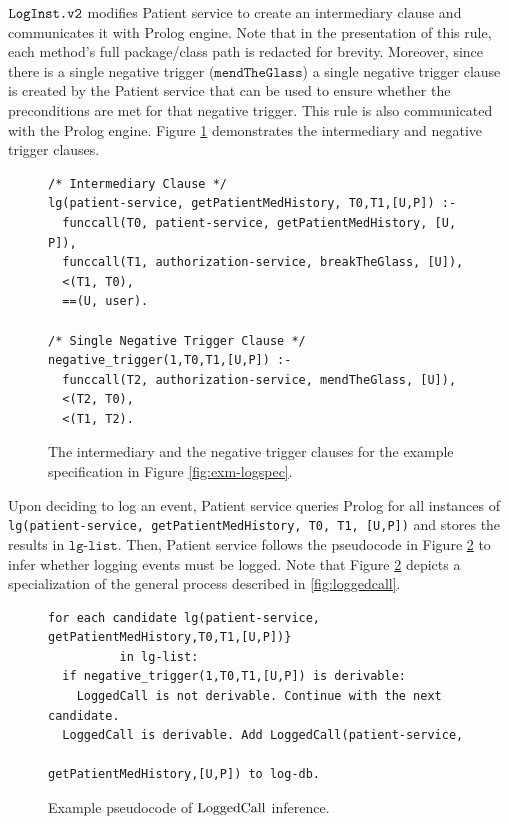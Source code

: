$\texttt{LogInst.v2}$ modifies Patient service to create an intermediary clause and communicates it with Prolog engine. Note that in the presentation of this rule, each method's full package/class path is redacted for brevity. Moreover, since there is a single negative trigger ($\texttt{mendTheGlass}$) a single negative trigger clause is created by the Patient service that can be used to ensure whether the preconditions are met for that negative trigger. This rule is also communicated with the Prolog engine.  Figure \ref{fig:exm-intermediary} demonstrates the intermediary and negative trigger clauses.

\begin{figure}
\begin{tiny}
\begin{Verbatim}[frame=single]
/* Intermediary Clause */
lg(patient-service, getPatientMedHistory, T0,T1,[U,P]) :- 
  funccall(T0, patient-service, getPatientMedHistory, [U, P]),
  funccall(T1, authorization-service, breakTheGlass, [U]),
  <(T1, T0),
  ==(U, user).

/* Single Negative Trigger Clause */ 
negative_trigger(1,T0,T1,[U,P]) :-
  funccall(T2, authorization-service, mendTheGlass, [U]),
  <(T2, T0),
  <(T1, T2).
\end{Verbatim}
\end{tiny}
\caption{The intermediary and the negative trigger clauses for the example specification in Figure \ref{fig:exm-logspec}.}
\label{fig:exm-intermediary}
\end{figure}

Upon deciding to log an event, Patient service queries Prolog for all instances of \texttt{lg(patient-service, getPatientMedHistory, T0, T1, [U,P])} and stores the results in $\texttt{lg-list}$. Then, Patient service follows the pseudocode in Figure \ref{fig:exm-loggedcall} to infer whether logging events must be logged. Note that Figure \ref{fig:exm-loggedcall} depicts a specialization of the general process described in  \ref{fig:loggedcall}.

\begin{figure}
\begin{tiny}
\begin{Verbatim}[frame=single]
for each candidate lg(patient-service, getPatientMedHistory,T0,T1,[U,P])} 
          in lg-list:
  if negative_trigger(1,T0,T1,[U,P]) is derivable:
    LoggedCall is not derivable. Continue with the next candidate. 
  LoggedCall is derivable. Add LoggedCall(patient-service, 
                                          getPatientMedHistory,[U,P]) to log-db.
\end{Verbatim}
\end{tiny}
\caption{Example pseudocode of $\mathrm{LoggedCall}$ inference.}
\label{fig:exm-loggedcall}
\end{figure}





